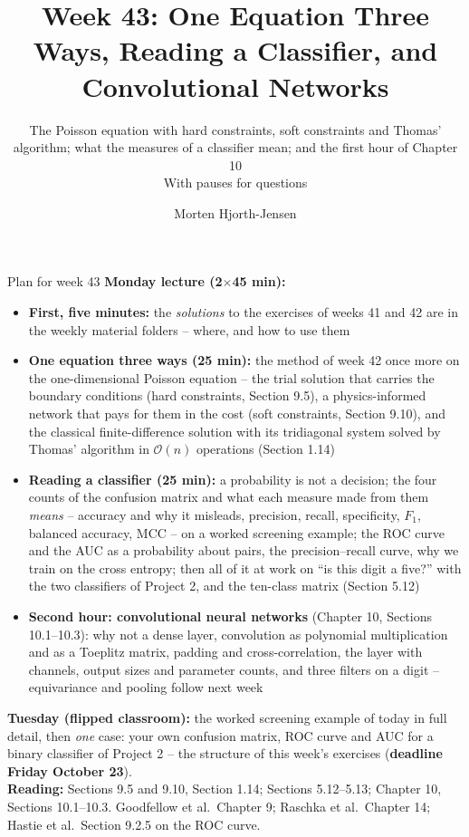 \documentclass[10pt,aspectratio=169]{beamer}
\title{Week 43: One Equation Three Ways, Reading a Classifier, and Convolutional Networks}
\subtitle{The Poisson equation with hard constraints, soft constraints and
  Thomas' algorithm; what the measures of a classifier mean; and the first
  hour of Chapter 10\\[3pt]
  \small With pauses for questions}
\author{Morten Hjorth-Jensen}
\institute{Department of Physics and Center for Computing in Science Education,\\
  University of Oslo, Norway}
\date{}
\begin{document}
\begin{frame}
\titlepage
\end{frame}

\begin{frame}{Plan for week 43}
\footnotesize
\textbf{Monday lecture (2$\times$45 min):}
\begin{itemize}
  \item \textbf{First, five minutes:} the \emph{solutions} to the exercises
        of weeks 41 and 42 are in the weekly material folders -- where, and
        how to use them
  \item \textbf{One equation three ways (25 min):} the method of week 42
        once more on the one-dimensional Poisson equation -- the trial
        solution that carries the boundary conditions (hard constraints,
        Section 9.5), a physics-informed network that pays for them in the
        cost (soft constraints, Section 9.10), and the classical
        finite-difference solution with its tridiagonal system solved by
        Thomas' algorithm in $\mathcal{O}(n)$ operations (Section 1.14)
  \item \textbf{Reading a classifier (25 min):} a probability is not a
        decision; the four counts of the confusion matrix and what each
        measure made from them \emph{means} -- accuracy and why it misleads,
        precision, recall, specificity, $F_1$, balanced accuracy, MCC -- on a
        worked screening example; the ROC curve and the AUC as a probability
        about pairs, the precision--recall curve, why we train on the cross
        entropy; then all of it at work on ``is this digit a five?'' with
        the two classifiers of Project 2, and the ten-class matrix
        (Section 5.12)
  \item \textbf{Second hour: convolutional neural networks} (Chapter 10,
        Sections 10.1--10.3): why not a dense layer, convolution as
        polynomial multiplication and as a Toeplitz matrix, padding and
        cross-correlation, the layer with channels, output sizes and
        parameter counts, and three filters on a digit -- equivariance and
        pooling follow next week
\end{itemize}
\textbf{Tuesday (flipped classroom):} the worked screening example of today
in full detail, then \emph{one} case: your own confusion matrix, ROC curve
and AUC for a binary classifier of Project 2 -- the structure of this
week's exercises (\textbf{deadline Friday October 23}).\\[2pt]
\textbf{Reading:} Sections 9.5 and 9.10, Section 1.14; Sections 5.12--5.13;
Chapter 10, Sections 10.1--10.3.  Goodfellow et al.\ Chapter 9;
Raschka et al.\ Chapter 14; Hastie et al.\ Section 9.2.5 on the ROC curve.
\end{frame}
\end{document}

